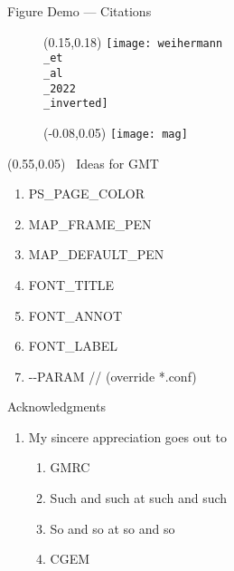 \documentclass[dark]{cgem-presentation}
\begin{document}
  \begin{frame}{Figure Demo --- Citations}
    \begin{figure}
      \begin{textblock*}{0.7\paperwidth}(0.15\paperwidth,0.18\paperheight)
        \texttt{[image: weihermann\\\_et\\\_al\\\_2022\\\_inverted]}
      \end{textblock*}
    \end{figure}
  \end{frame}

  \begin{frame}
    \begin{figure}
      \begin{textblock*}{0.7\paperwidth}(-0.08\paperwidth,0.05\paperheight)
        \texttt{[image: mag]}
      \end{textblock*}
    \end{figure}
    \begin{textblock*}{0.5\paperwidth}(0.55\paperwidth,0.05\paperheight)
      \Huge
      \,\,\,Ideas for GMT
      \begin{enumerate}
        \item PS\_PAGE\_COLOR
        \item MAP\_FRAME\_PEN
        \item MAP\_DEFAULT\_PEN
        \item FONT\_TITLE
        \item FONT\_ANNOT
        \item FONT\_LABEL
        \item -\hspace{0.1mm}-PARAM //
          (override *.conf)
      \end{enumerate}
    \end{textblock*}

  \end{frame}

  \begin{frame}{Acknowledgments}
    \vspace{-2cm}
    \begin{enumerate}
      \item My sincere appreciation goes out to
      \begin{enumerate}
        \item GMRC
        \item Such and such at such and such
        \item So and so at so and so
        \item CGEM 
      \end{enumerate}
    \end{enumerate}
  \end{frame}
\end{document}
